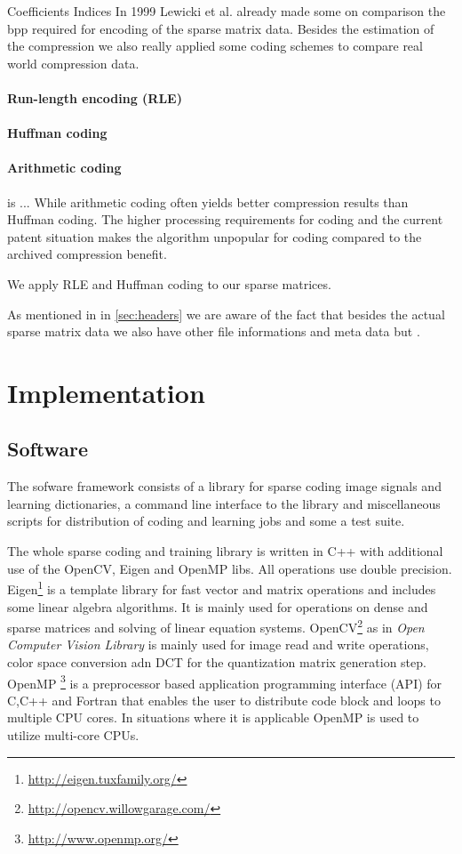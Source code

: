 Coefficients
Indices
In 1999 Lewicki et al.\cite{Lewicki1999} already made some on comparison 
the bpp required for encoding of the sparse matrix data. Besides the estimation
of the compression we also really applied some coding schemes to compare real
world compression data.
\cite{Murray2006}

\paragraph{Run-length encoding (RLE)}
\paragraph{Huffman coding}
\paragraph{Arithmetic coding} is ...
While arithmetic coding often yields better compression results than Huffman
coding. The higher processing requirements for coding and the current patent
situation makes the algorithm unpopular for coding compared to the archived
compression benefit.

We apply RLE and Huffman coding to our sparse matrices. 


As mentioned in in \ref{sec:headers} we are aware of the fact that besides
the actual sparse matrix data we also have other file informations and meta
data but .  



\section{Implementation}
\subsection*{Software}
The sofware framework consists of a library for sparse coding image signals 
and learning dictionaries, a command line interface to the library and
miscellaneous scripts for distribution of coding and learning jobs and
some a test suite.

The whole sparse coding and training library is written in C++ with
additional use of the OpenCV, Eigen and OpenMP libs. All operations use double
precision. Eigen\footnote{\url{http://eigen.tuxfamily.org/}\cite{Eigen}}
is a template library for fast vector and matrix operations 
and includes some linear algebra algorithms. It is mainly used for operations on
dense and sparse matrices and solving of linear equation
systems. OpenCV\footnote{\url{http://opencv.willowgarage.com/}\cite{OpenCV}} as
in \emph{Open Computer Vision Library} is mainly used for
image read and write operations, color space conversion adn DCT for the
quantization matrix generation step. OpenMP
\footnote{\url{http://www.openmp.org/}\cite{OpenMP}} is a preprocessor
based application programming interface (API) for C,C++ and Fortran that enables
the user to distribute code block and loops to multiple CPU cores. In situations
where it is applicable OpenMP is used to utilize multi-core CPUs. 


